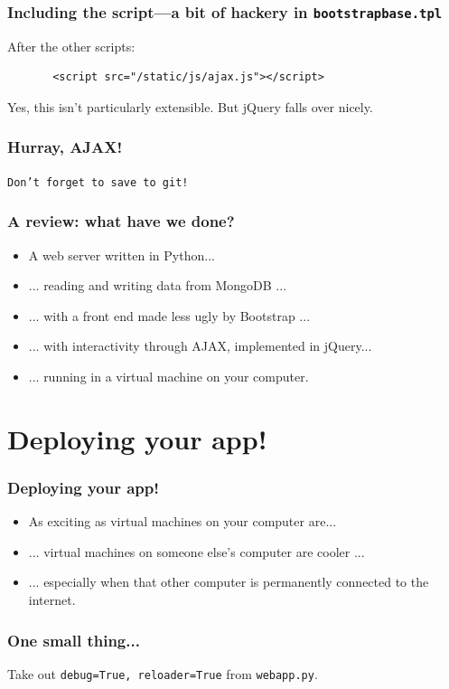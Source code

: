 \documentclass{beamer}
\begin{document}
\begin{frame}[fragile]
  \frametitle{Including the script---a bit of hackery in
    \texttt{bootstrapbase.tpl}}
  
  After the other scripts:
  \begin{verbatim}
       <script src="/static/js/ajax.js"></script>
  \end{verbatim}

  Yes, this isn't particularly extensible. But jQuery falls over
  nicely.
\end{frame}

\begin{frame}
  \frametitle{Hurray, AJAX!}

  \texttt{Don't forget to save to git!}
\end{frame}

\begin{frame}
  \frametitle{A review: what have we done?}
  \begin{itemize}
  \item A web server written in Python...
  \item ... reading and writing data from MongoDB ...
  \item ... with a front end made less ugly by Bootstrap ...
  \item ... with interactivity through AJAX, implemented in jQuery...
  \item ... running in a virtual machine on your computer.
  \end{itemize}
\end{frame}

\section{Deploying your app!}

\begin{frame}
  \frametitle{Deploying your app!}
  \begin{itemize}
  \item As exciting as virtual machines on your computer are...
  \item ... virtual machines on someone else's computer are cooler ...
  \item ... especially when that other computer is permanently
    connected to the internet.
  \end{itemize}
\end{frame}

\begin{frame}
  \frametitle{One small thing...}
  Take out \texttt{debug=True, reloader=True} from \texttt{webapp.py}.
\end{frame}
\end{document}
